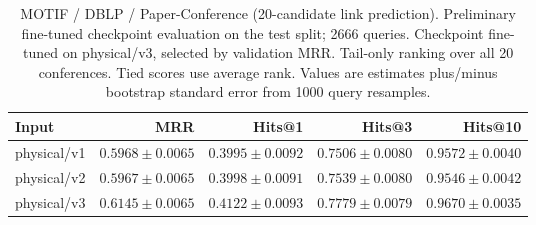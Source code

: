 \begin{table}[t]
\centering
\small
\begin{tabular}{lrrrr}
\toprule
Input & MRR & Hits@1 & Hits@3 & Hits@10 \\
\midrule
physical/v1 & $0.5968 \pm 0.0065$ & $0.3995 \pm 0.0092$ & $0.7506 \pm 0.0080$ & $0.9572 \pm 0.0040$ \\
physical/v2 & $0.5967 \pm 0.0065$ & $0.3998 \pm 0.0091$ & $0.7539 \pm 0.0080$ & $0.9546 \pm 0.0042$ \\
physical/v3 & $0.6145 \pm 0.0065$ & $0.4122 \pm 0.0093$ & $0.7779 \pm 0.0079$ & $0.9670 \pm 0.0035$ \\
\bottomrule
\end{tabular}
\caption{MOTIF / DBLP / Paper-Conference (20-candidate link prediction). Preliminary fine-tuned checkpoint evaluation on the test split; 2666 queries. Checkpoint fine-tuned on physical/v3, selected by validation MRR. Tail-only ranking over all 20 conferences. Tied scores use average rank. Values are estimates plus/minus bootstrap standard error from 1000 query resamples.}
\label{tab:motif-paper_conference-link_prediction}
\end{table}
